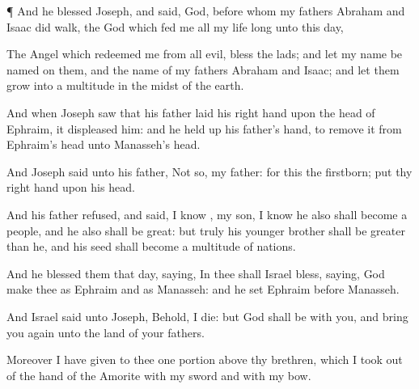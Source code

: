 {\par }{\PP {}¶ And he
blessed
Joseph, and
said,
God,
before whom my
fathers
Abraham and
Isaac did
walk, the
God which
fed me all my life
long unto this
day,

The
Angel which
redeemed me from all
evil,
bless the
lads; and let my
name be
named on them, and the
name of my
fathers
Abraham and
Isaac; and let them
grow into a
multitude in the
midst of the
earth.

And when
Joseph
saw that his
father
laid his
right
hand upon the
head of
Ephraim, it
displeased him: and he held
up his
father’s
hand, to
remove it from
Ephraim’s
head unto
Manasseh’s
head.

And
Joseph
said unto his
father, Not so, my
father: for this
{} the
firstborn;
put thy right
hand upon his
head.

And his
father
refused, and
said, I
know
{}, my
son, I
know
{} he also shall become a
people, and he also shall be
great: but
truly his
younger
brother shall be
greater than he, and his
seed shall become a
multitude of
nations.

And he
blessed them that
day,
saying, In thee shall
Israel
bless,
saying,
God
make thee as
Ephraim and as
Manasseh: and he
set
Ephraim
before
Manasseh.

And
Israel
said unto
Joseph, Behold, I
die: but
God shall be with you, and bring you
again unto the
land of your
fathers.

Moreover I have
given to thee
one
portion above thy
brethren, which I
took out of the
hand of the
Amorite with my
sword and with my
bow.




\par }
